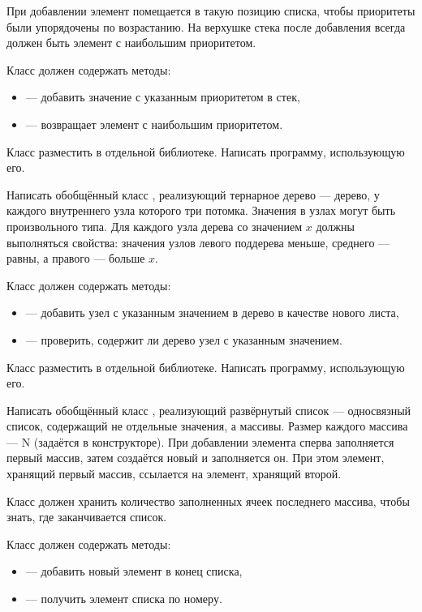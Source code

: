 При добавлении элемент помещается в такую позицию списка, чтобы
приоритеты были упорядочены по возрастанию. На верхушке стека после
добавления всегда должен быть элемент с наибольшим приоритетом.

Класс должен содержать методы:
\begin{itemize}
\item {} — добавить значение с указанным приоритетом в стек,
\item {} — возвращает элемент с наибольшим приоритетом.
\end{itemize}

Класс разместить в отдельной библиотеке. Написать программу,
использующую его.

\task Написать обобщённый класс , реализующий
тернарное дерево — дерево, у каждого
внутреннего узла которого три потомка. Значения в узлах могут быть
произвольного типа. Для каждого узла дерева со значением $x$ должны
выполняться свойства: значения узлов левого поддерева меньше, среднего
— равны, а правого — больше $x$.

Класс должен содержать методы:
\begin{itemize}
\item {} — добавить узел с указанным значением в дерево в
  качестве нового листа,
\item {} — проверить, содержит ли дерево узел с указанным
  значением.
\end{itemize}

Класс разместить в отдельной библиотеке. Написать программу,
использующую его.

\task Написать обобщённый класс , реализующий
развёрнутый список — односвязный список,
содержащий не отдельные значения, а массивы. Размер каждого массива —
N (задаётся в конструкторе). При добавлении элемента сперва
заполняется первый массив, затем создаётся новый и заполняется он. При
этом элемент, хранящий первый массив, ссылается на элемент, хранящий
второй.

Класс должен хранить количество заполненных ячеек последнего
массива, чтобы знать, где заканчивается список.

Класс должен содержать методы:
\begin{itemize}
\item {} — добавить новый элемент в конец списка,
\item {} — получить элемент списка по номеру.
\end{itemize}


